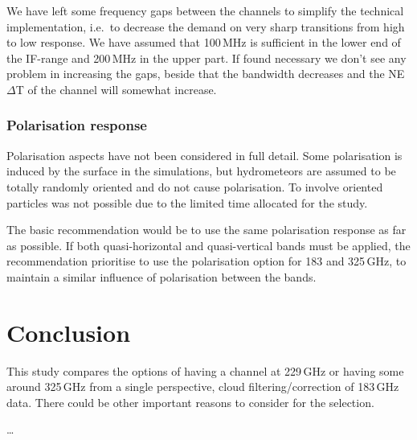 \documentclass[12pt]{article}
\begin{document}
We have left some frequency gaps between the channels to simplify the technical
implementation, i.e.\ to decrease the demand on very sharp transitions from high
to low response. We have assumed that 100\,MHz is sufficient in the lower end
of the IF-range and 200\,MHz in the upper part. If found necessary we don't see
any problem in increasing the gaps, beside that the bandwidth decreases and the
NE$\Delta$T of the channel will somewhat increase.


\subsubsection{Polarisation response}
%
Polarisation aspects have not been considered in full detail. Some polarisation
is induced by the surface in the simulations, but hydrometeors are assumed to
be totally randomly oriented and do not cause polarisation. To involve oriented
particles was not possible due to the limited time allocated for the study.

The basic recommendation would be to use the same polarisation response as far
as possible. If both quasi-horizontal and quasi-vertical bands must be applied,
the recommendation prioritise to use the polarisation option for 183 and
325\,GHz, to maintain a similar influence of polarisation between the bands.







\section{Conclusion}
%
This study compares the options of having a channel at 229\,GHz or having some
around 325\,GHz from a single perspective, cloud filtering/correction of
183\,GHz data. There could be other important reasons to consider for the
selection.

\dots


{\footnotesize

}
\end{document}
